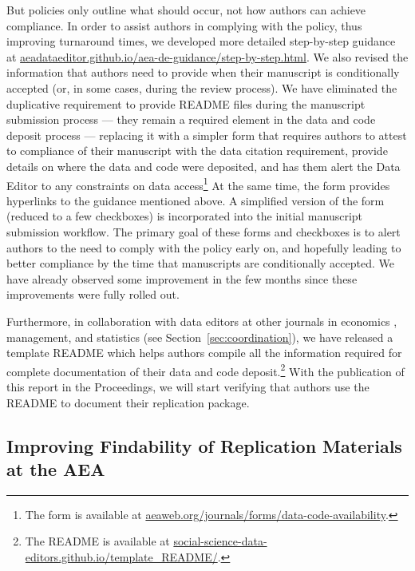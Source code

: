 \documentclass[PP]{AEA}
\begin{document}
But policies only outline what should occur, not how authors can achieve compliance. In order to assist authors in complying with the policy, thus improving turnaround times, we developed more detailed step-by-step guidance at \href{https://aeadataeditor.github.io/aea-de-guidance/step-by-step.html}{aeadataeditor.github.io/aea-de-guidance/step-by-step.html}. We also revised the information that authors need to provide when their manuscript is conditionally accepted (or, in some cases, during the review process). We have eliminated the duplicative requirement to provide  README files during the manuscript submission process --- they remain a required element in the data and code deposit process --- replacing it with a simpler form that requires authors to attest to compliance of their manuscript with the data citation requirement, provide details on where the data and code were deposited, and has them alert the Data Editor to any constraints on data access\footnote{The form is available at \href{https://www.aeaweb.org/journals/forms/data-code-availability}{aeaweb.org/journals/forms/data-code-availability}.} At the same time, the form provides hyperlinks to the guidance mentioned above. A simplified version of the form (reduced to a few checkboxes) is incorporated into the initial manuscript submission workflow. The primary goal of these forms and checkboxes is to alert authors to the need to comply with the policy early on, and hopefully leading to better compliance by the time that manuscripts are conditionally accepted. We have already observed some improvement in the few months since these improvements were fully rolled out.

Furthermore, in collaboration with data editors at other journals in economics , management, and statistics (see Section~\ref{sec:coordination}), we have released a template README \citep{READMEv1.0.0} which helps authors compile all the information required for complete documentation of their data and code deposit.\footnote{The README is available at \href{https://social-science-data-editors.github.io/template_README/}{social-science-data-editors.github.io/template\_README/}.} With the publication of this report in the Proceedings, we will start verifying that authors use the README to document their replication package.


\subsection{Improving Findability of Replication Materials at the AEA}
\label{sec:findability}
\end{document}
